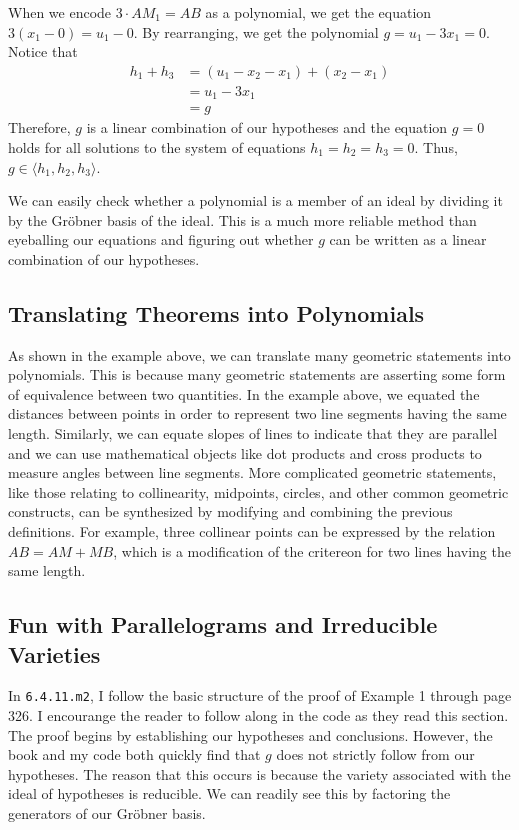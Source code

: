 \documentclass{article}
\theoremstyle{plain}
\theoremstyle{definition}
\theoremstyle{remark}
\newcommand{\gro}{Gr\"obner }
\begin{document}
When we encode $3\cdot AM_1 = AB$ as a polynomial, we get the equation $3 (x_1 - 0) = u_1 - 0$. By rearranging, we get the polynomial $g = u_1 - 3x_1 = 0$.
Notice that
\begin{align*}
    h_1 + h_3 & = (u_1 - x_2 - x_1) + (x_2 - x_1)\\
              & = u_1 - 3x_1\\
              & = g
\end{align*}
Therefore, $g$ is a linear combination of our hypotheses and the equation $g = 0$ holds for all solutions to the system of equations $h_1 = h_2 = h_3 = 0$.
Thus, $g \in \langle h_1,h_2,h_3 \rangle$.

We can easily check whether a polynomial is a member of an ideal by dividing it by the \gro basis of the ideal.
This is a much more reliable method than eyeballing our equations and figuring out whether $g$ can be written as a linear combination of our hypotheses.

\subsection{Translating Theorems into Polynomials}
As shown in the example above, we can translate many geometric statements into polynomials. 
This is because many geometric statements are asserting some form of equivalence between two quantities.
In the example above, we equated the distances between points in order to represent two line segments having the same length.
Similarly, we can equate slopes of lines to indicate that they are parallel and we can use mathematical objects like dot products and cross products to measure angles between line segments.
More complicated geometric statements, like those relating to collinearity, midpoints, circles, and other common geometric constructs, 
can be synthesized by modifying and combining the previous definitions.
For example, three collinear points can be expressed by the relation $AB = AM + MB$, which is a modification of the critereon for two lines having the same length.

\subsection{Fun with Parallelograms and Irreducible Varieties}
In \texttt{6.4.11.m2}, I follow the basic structure of the proof of Example 1 through page 326. I encourange the reader to follow along in the code as they read this section.
The proof begins by establishing our hypotheses and conclusions.
However, the book and my code both quickly find that $g$ does not strictly follow from our hypotheses.
The reason that this occurs is because the variety associated with the ideal of hypotheses is reducible.
We can readily see this by factoring the generators of our \gro basis. 
\end{document}
